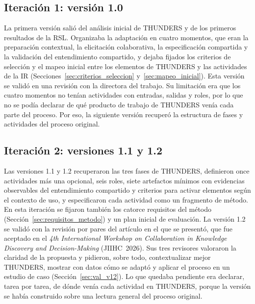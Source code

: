 \documentclass[12pt,letterpaper,oneside]{report}
\begin{document}
\subsection{Iteración 1: versión 1.0}
La primera versión salió del análisis inicial de THUNDERS y de los primeros
resultados de la RSL. Organizaba la adaptación en cuatro momentos, que eran la
preparación contextual, la elicitación colaborativa, la especificación
compartida y la validación del entendimiento compartido, y dejaba fijados los criterios
de selección y el mapeo inicial entre los elementos de THUNDERS y las
actividades de la IR (Secciones~\ref{sec:criterios_seleccion}
y~\ref{sec:mapeo_inicial}). Esta versión se validó en una revisión con la
directora del trabajo. Su limitación era que los cuatro momentos no tenían
actividades con entradas, salidas y roles, por lo que no se podía declarar de
qué producto de trabajo de THUNDERS venía cada parte del proceso. Por eso, la siguiente
versión recuperó la estructura de fases y actividades del proceso original.



\subsection{Iteración 2: versiones 1.1 y 1.2}
Las versiones 1.1 y 1.2 recuperaron las tres fases de THUNDERS, definieron once
actividades más una opcional, seis roles, siete artefactos mínimos con
evidencias observables del entendimiento compartido y criterios para activar
elementos según el contexto de uso, y
especificaron cada actividad como un fragmento de método. En esta iteración se
fijaron también los catorce requisitos del método
(Sección~\ref{sec:requisitos_metodo}) y un plan inicial de evaluación. La versión 1.2 se validó con la revisión por pares del
artículo en el que se presentó, que fue aceptado en el \textit{4th
International Workshop on Collaboration in Knowledge Discovery and
Decision-Making} (JIIHC~2026). Sus tres revisores valoraron la claridad de la propuesta y pidieron, sobre todo,
contextualizar mejor THUNDERS, mostrar
con datos cómo se adaptó y aplicar el proceso en un estudio de caso
(Sección~\ref{sec:val_v12}). Lo que quedaba pendiente era declarar, tarea por
tarea, de dónde venía cada actividad en THUNDERS, porque la versión se había
construido sobre una lectura general del proceso original.
\end{document}
